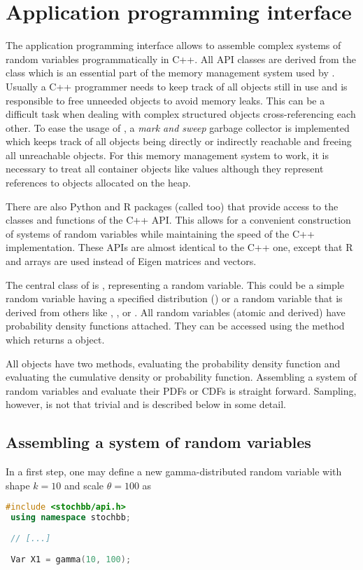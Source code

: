 \section{Application programming interface} \label{sec:api}
The application programming interface \cite[API, see also][]{stochbbapi} 
allows to assemble complex systems of random variables programmatically in C++.
All API classes are derived from the  class which is an essential part of the
memory management system used by . Usually a C++ programmer needs to keep track of all
objects still in use and is responsible to free unneeded objects to avoid memory leaks. This can
be a difficult task when dealing with complex structured objects cross-referencing each other.
To ease the usage of , a \emph{mark and sweep} garbage collector is implemented which keeps track
of all objects being directly or indirectly reachable and freeing all unreachable objects. For
this memory management system to work, it is necessary to treat all container objects like values
although they represent references to objects allocated on the heap.

There are also Python and R packages (called  too) that provide access to
the classes and functions of the C++ API. This allows for a convenient construction of systems
of random variables while maintaining the speed of the C++ implementation. These APIs are 
almost identical to the C++ one, except that R and  arrays are used instead of Eigen matrices
and vectors.

The central class of  is , representing a random variable. This could be a
simple random variable having a specified distribution () or a random
variable that is derived from others like , ,  or
. All random variables (atomic and derived) have probability density functions
attached. They can be accessed using the  method which returns a 
 object.

All  objects have two methods,  evaluating the probability
density function and  evaluating the cumulative density or probability
function. Assembling a system of random variables and evaluate their PDFs or CDFs is straight
forward. Sampling, however, is not that trivial and is described below in some detail.

\subsection{Assembling a system of random variables}
In a first step, one may define a new gamma-distributed random variable with shape $k=10$
and scale $\theta=100$ as
\begin{lstlisting}[language=C++]
 #include <stochbb/api.h>
 using namespace stochbb;
 
 // [...]
 
 Var X1 = gamma(10, 100);
\end{lstlisting}

